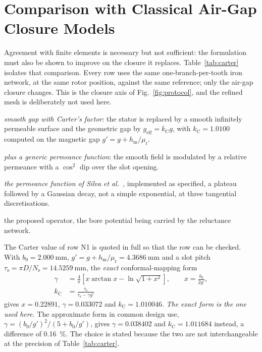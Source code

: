 \documentclass[10pt,a4paper,twocolumn]{article}
\newcommand{\murec}{\mu_{\mathrm{r}}}
\theoremstyle{plain}
\theoremstyle{remark}
\begin{document}

\section{Comparison with Classical Air-Gap Closure Models}
\label{sec:closures}

Agreement with finite elements is necessary but not sufficient: the
formulation must also be shown to improve on the closure it replaces.
Table~\ref{tab:carter} isolates that comparison. Every row uses the
same one-branch-per-tooth iron network, at the same rotor position,
against the same reference; only the air-gap closure changes. This is
the closure axis of Fig.~\ref{fig:protocol}, and the refined mesh is
deliberately not used here.

\begin{description}[leftmargin=2.4em,style=sameline,font=\normalfont\bfseries]
\item[N1] \emph{smooth gap with Carter's factor}: the stator is replaced
by a smooth infinitely permeable surface and the geometric gap by
$g_{\mathrm{eff}}=k_{\mathrm{C}}g$, with $k_{\mathrm{C}}=\num{1.0100}$
computed on the magnetic gap $g'=g+h_{\mathrm{m}}/\murec$.
\item[N2] \emph{plus a generic permeance function}: the smooth field is
modulated by a relative permeance with a $\cos^2$ dip over the slot
opening.
\item[N2b] \emph{the permeance function of Silva} \emph{et
al.}~\cite{silva2023}, implemented as specified, a plateau followed by
a Gaussian decay, not a simple exponential, at three tangential
discretisations.
\item[N3] the proposed operator, the bore potential being carried by the
reluctance network.
\end{description}

The Carter value of row N1 is quoted in full so that the row can be
checked. With $b_0=\SI{2.000}{\milli\metre}$,
$g'=g+h_{\mathrm{m}}/\murec=\SI{4.3686}{\milli\metre}$ and a slot
pitch $\tau_{\mathrm{s}}=\pi D/N_{\mathrm{s}}
=\SI{14.5259}{\milli\metre}$, the \emph{exact} conformal-mapping form
\begin{equation}
\begin{aligned}
\gamma&=\frac{4}{\pi}\left[x\arctan x-\ln\sqrt{1+x^{2}}\right],
\qquad x=\frac{b_0}{2g'},\\[2pt]
k_{\mathrm{C}}&=\frac{\tau_{\mathrm{s}}}{\tau_{\mathrm{s}}-\gamma g'}
\end{aligned}
\label{eq:carter}
\end{equation}
gives $x=\num{0.22891}$, $\gamma=\num{0.033072}$ and
$k_{\mathrm{C}}=\num{1.010046}$. \emph{The exact form is the one used
here.} The approximate form in common design use,
$\gamma=(b_0/g')^{2}/(5+b_0/g')$, gives $\gamma=\num{0.038402}$ and
$k_{\mathrm{C}}=\num{1.011684}$ instead, a difference of
\SI{0.16}{\percent}. The choice is stated because the two are not
interchangeable at the precision of Table~\ref{tab:carter}.
\end{document}
